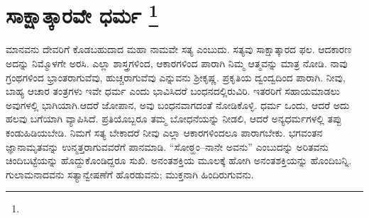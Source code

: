 
\chapter[ಸಾಕ್ಷಾತ್ಕಾರವೇ ಧರ್ಮ ]{ಸಾಕ್ಷಾತ್ಕಾರವೇ ಧರ್ಮ \protect\footnote{}}

ಮಾನವನು ದೇವರಿಗೆ ಕೊಡಬಹುದಾದ ಮಹಾ ನಾಮವೇ ಸತ್ಯ ಎಂಬುದು. ಸತ್ಯವು ಸಾಕ್ಷಾತ್ಕಾರದ ಫಲ. ಆದಕಾರಣ ಅದನ್ನು ನಿಮ್ಮೊಳಗೇ ಅರಸಿ. ಎಲ್ಲಾ ಶಾಸ್ತ್ರಗಳಿಂದ, ಆಕಾರಗಳಿಂದ ಪಾರಾಗಿ ನಿಮ್ಮ ಆತ್ಮವನ್ನು ಮಾತ್ರ ನೋಡಿ. ನಾವು ಗ್ರಂಥಗಳಿಂದ ಭ್ರಾಂತರಾಗುವೆವು, ಹುಚ್ಚರಾಗುವೆವು ಎನ್ನುವನು ಶ‍್ರೀಕೃಷ್ಣ. ಪ್ರಕೃತಿಯ ದ್ವಂದ್ವದಿಂದ ಪಾರಾಗಿ. ನೀವು, ಬಾಹ್ಯ ಆಚಾರ ತಂತ್ರಗಳು ಇವೇ ಧರ್ಮ ಎಂದು ಭಾವಿಸಿದರೆ ಬಂಧನದಲ್ಲಿರುವಿರಿ. ಇತರರಿಗೆ ಸಹಾಯಮಾಡಲು ಅವುಗಳಲ್ಲಿ ಭಾಗಿಯಾಗಿ.ಆದರೆ ಜೋಪಾನ, ಅವು ಬಂಧನವಾಗದಂತೆ ನೋಡಿಕೊಳ್ಳಿ. ಧರ್ಮ ಒಂದು, ಆದರೆ ಅದು ಹಲವು ಬಗೆಯಾಗಿ ವ್ಯಾಪಿಸಿದೆ. ಪ್ರತಿಯೊಬ್ಬರೂ ತಮ್ಮ ಬೋಧನೆಯನ್ನು ನೀಡಲಿ, ಆದರೆ ಅನ್ಯಧರ್ಮಗಳಲ್ಲಿ ತಪ್ಪು ಕಂಡುಹಿಡಿಯಬೇಡಿ. ನಿಮಗೆ ಸತ್ಯ ಬೇಕಾದರೆ ನೀವು ಎಲ್ಲಾ ಆಕಾರಗಳಿಂದಲೂ ಪಾರಾಗಬೇಕು. ಭಗವಂತನ ಜ್ಞಾನಾಮೃತವನ್ನು ಉನ್ಮತ್ತರಾಗುವವರೆಗೆ ಪಾನಮಾಡಿ. “ಸೋಠ್ಹಂ–ನಾನೇ ಅವನು” ಎಂಬುದನ್ನು ಅರಿತವನು ಚಿಂದಿಬಟ್ಟೆಯನ್ನು ಹೊದ್ದುಕೊಂಡಿದ್ದರೂ ಸುಖಿ. ಅನಂತಶಕ್ತಿಯ ಮೂಲಕ್ಕೆ ಹೋಗಿ ಅನಂತಶಕ್ತಿಯನ್ನು ಹೊಂದಿಬನ್ನಿ. ಗುಲಾಮನಾದವನು ಸತ್ಯಾನ್ವೇಷಣೆಗೆ ಹೊರಡುವನು; ಮುಕ್ತನಾಗಿ ಹಿಂದಿರುಗುವನು.

